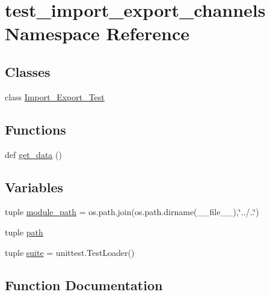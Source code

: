 \hypertarget{namespacetest__import__export__channels}{}\section{test\+\_\+import\+\_\+export\+\_\+channels Namespace Reference}
\label{namespacetest__import__export__channels}
\subsection*{Classes}
\begin{DoxyCompactItemize}
\item 
class \hyperlink{classtest__import__export__channels_1_1Import__Export__Test}{Import\+\_\+\+Export\+\_\+\+Test}
\end{DoxyCompactItemize}
\subsection*{Functions}
\begin{DoxyCompactItemize}
\item 
def \hyperlink{namespacetest__import__export__channels_a0b4f2c7ef725919e726db8eda204de2a}{get\+\_\+data} ()
\end{DoxyCompactItemize}
\subsection*{Variables}
\begin{DoxyCompactItemize}
\item 
tuple \hyperlink{namespacetest__import__export__channels_a1d8049e561f61ad4d9e96d9d92fa6cec}{module\+\_\+path} = os.\+path.\+join(os.\+path.\+dirname(\+\_\+\+\_\+file\+\_\+\+\_\+),\char`\"{}../..\char`\"{})
\item 
tuple \hyperlink{namespacetest__import__export__channels_aecdc8763041cb0949315a5b95771b89f}{path}
\item 
tuple \hyperlink{namespacetest__import__export__channels_a92ebe28bae0a3b091c98d16c6fcc3bdf}{suite} = unittest.\+Test\+Loader()
\end{DoxyCompactItemize}


\subsection{Function Documentation}
\hypertarget{namespacetest__import__export__channels_a0b4f2c7ef725919e726db8eda204de2a}{}
